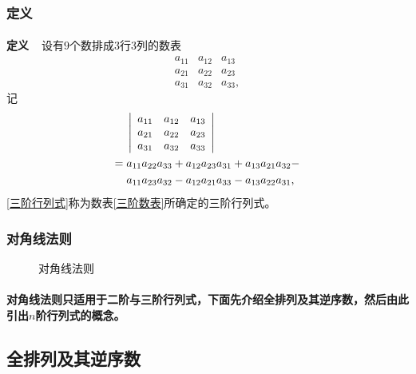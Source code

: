 \subsubsection{定义}
\paragraph{}
\textbf{定义~~}设有$9$个数排成$3$行$3$列的数表
\begin{equation}
  \label{三阶数表}
  \begin{array}{ccc}
    a_{11} & a_{12} & a_{13} \\
    a_{21} & a_{22} & a_{23} \\
    a_{31} & a_{32} & a_{33},
  \end{array}
\end{equation}
记
\begin{align}
\centering
  \begin{split}
    \label{三阶行列式}
    &\;\left|\begin{array}{ccc}
      a_{11} & a_{12} & a_{13} \\
      a_{21} & a_{22} & a_{23} \\
      a_{31} & a_{32} & a_{33}
    \end{array}\right| \\
    =&\; a_{11}a_{22}a_{33} + a_{12}a_{23}a_{31} + a_{13}a_{21}a_{32} - \\
    &\; a_{11}a_{23}a_{32} - a_{12}a_{21}a_{33} - a_{13}a_{22}a_{31},
  \end{split}
\end{align}
\eqref{三阶行列式}称为数表\eqref{三阶数表}所确定的三阶行列式。

\subsubsection{对角线法则}
\begin{figure}[H]
\centering
  
  \caption{对角线法则}
  \label{图:三阶对角线法则}
\end{figure}

\paragraph{}
\textbf{对角线法则只适用于二阶与三阶行列式，下面先介绍全排列及其逆序数，然后由此引出$n$阶行列式的概念。}

\subsection{全排列及其逆序数}
